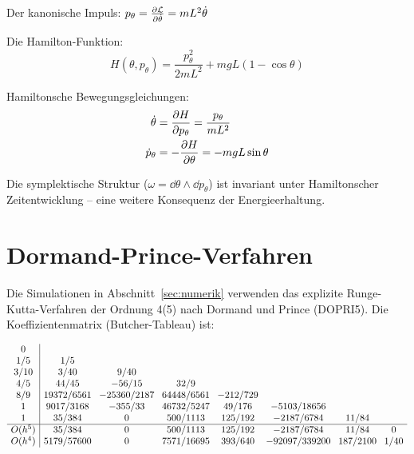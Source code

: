 ﻿\documentclass[12pt, a4paper]{report}
\theoremstyle{definition}
\theoremstyle{remark}
\begin{document}
Der kanonische Impuls: $p_\theta = \pdv{\mathcal{L}}{\dot\theta} = mL^2\dot\theta$

Die Hamilton-Funktion:
\begin{equation}
  H(\theta, p_\theta) = \frac{p_\theta^2}{2mL^2} + mgL(1-\cos\theta)
\end{equation}

Hamiltonsche Bewegungsgleichungen:
\begin{align}
  \dot\theta    &= \pdv{H}{p_\theta} = \frac{p_\theta}{mL^2} \\
  \dot{p}_\theta &= -\pdv{H}{\theta} = -mgL\sin\theta
\end{align}

Die symplektische Struktur ($\omega = \dd\theta \wedge \dd p_\theta$) ist invariant
unter Hamiltonscher Zeitentwicklung -- eine weitere Konsequenz der Energieerhaltung.

\section{Dormand-Prince-Verfahren}

Die Simulationen in Abschnitt~\ref{sec:numerik} verwenden das explizite
Runge-Kutta-Verfahren der Ordnung 4(5) nach Dormand und Prince (DOPRI5).
Die Koeffizientenmatrix (Butcher-Tableau) ist:

{\footnotesize
\begin{equation}
  \setlength{\arraycolsep}{4pt}
  \begin{array}{c|ccccccc}
    0      &         &         &         &        &         &       &      \\
    1/5    & 1/5     &         &         &        &         &       &      \\
    3/10   & 3/40    & 9/40    &         &        &         &       &      \\
    4/5    & 44/45   & -56/15  & 32/9    &        &         &       &      \\
    8/9    & 19372/6561 & -25360/2187 & 64448/6561 & -212/729 &    &       &      \\
    1      & 9017/3168 & -355/33 & 46732/5247 & 49/176 & -5103/18656 & & \\
    1      & 35/384  & 0       & 500/1113 & 125/192 & -2187/6784 & 11/84 & \\
    \hline
    O(h^5) & 35/384  & 0       & 500/1113 & 125/192 & -2187/6784 & 11/84 & 0 \\
    O(h^4) & 5179/57600 & 0   & 7571/16695 & 393/640 & -92097/339200 & 187/2100 & 1/40
  \end{array}
\end{equation}
}
\end{document}
